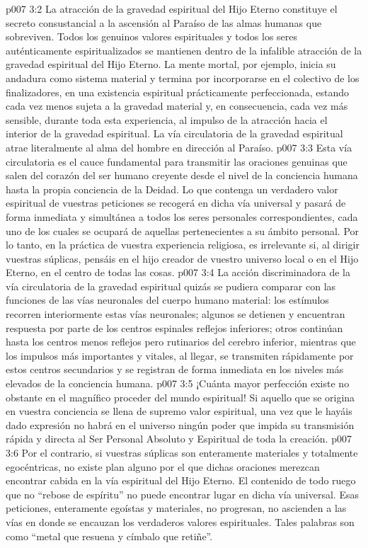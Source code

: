 \vs p007 3:2 La atracción de la gravedad espiritual del Hijo Eterno constituye el secreto consustancial a la ascensión al Paraíso de las almas humanas que sobreviven. Todos los genuinos valores espirituales y todos los seres auténticamente espiritualizados se mantienen dentro de la infalible atracción de la gravedad espiritual del Hijo Eterno. La mente mortal, por ejemplo, inicia su andadura como sistema material y termina por incorporarse en el colectivo de los finalizadores, en una existencia espiritual prácticamente perfeccionada, estando cada vez menos sujeta a la gravedad material y, en consecuencia, cada vez más sensible, durante toda esta experiencia, al impulso de la atracción hacia el interior de la gravedad espiritual. La vía circulatoria de la gravedad espiritual atrae literalmente al alma del hombre en dirección al Paraíso.
\vs p007 3:3 \pc Esta vía circulatoria es el cauce fundamental para transmitir las oraciones genuinas que salen del corazón del ser humano creyente desde el nivel de la conciencia humana hasta la propia conciencia de la Deidad. Lo que contenga un verdadero valor espiritual de vuestras peticiones se recogerá en dicha vía universal y pasará de forma inmediata y simultánea a todos los seres personales correspondientes, cada uno de los cuales se ocupará de aquellas pertenecientes a su ámbito personal. Por lo tanto, en la práctica de vuestra experiencia religiosa, es irrelevante si, al dirigir vuestras súplicas, pensáis en el hijo creador de vuestro universo local o en el Hijo Eterno, en el centro de todas las cosas.
\vs p007 3:4 \pc La acción discriminadora de la vía circulatoria de la gravedad espiritual quizás se pudiera comparar con las funciones de las vías neuronales del cuerpo humano material: los estímulos recorren interiormente estas vías neuronales; algunos se detienen y encuentran respuesta por parte de los centros espinales reflejos inferiores; otros continúan hasta los centros menos reflejos pero rutinarios del cerebro inferior, mientras que los impulsos más importantes y vitales, al llegar, se transmiten rápidamente por estos centros secundarios y se registran de forma inmediata en los niveles más elevados de la conciencia humana.
\vs p007 3:5 ¡Cuánta mayor perfección existe no obstante en el magnífico proceder del mundo espiritual! Si aquello que se origina en vuestra conciencia se llena de supremo valor espiritual, una vez que le hayáis dado expresión no habrá en el universo ningún poder que impida su transmisión rápida y directa al Ser Personal Absoluto y Espiritual de toda la creación.
\vs p007 3:6 Por el contrario, si vuestras súplicas son enteramente materiales y totalmente egocéntricas, no existe plan alguno por el que dichas oraciones merezcan encontrar cabida en la vía espiritual del Hijo Eterno. El contenido de todo ruego que no “rebose de espíritu” no puede encontrar lugar en dicha vía universal. Esas peticiones, enteramente egoístas y materiales, no progresan, no ascienden a las vías en donde se encauzan los verdaderos valores espirituales. Tales palabras son como “metal que resuena y címbalo que retiñe”.

